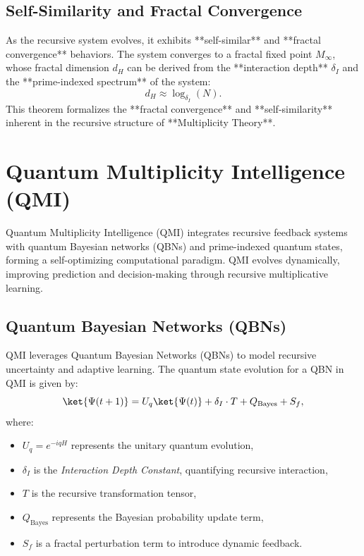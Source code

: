 \documentclass{article}
\theoremstyle{plain}
\begin{document}
\subsection{Self-Similarity and Fractal Convergence}
As the recursive system evolves, it exhibits **self-similar** and **fractal convergence** behaviors. The system converges to a fractal fixed point \( M_\infty \), whose fractal dimension \( d_H \) can be derived from the **interaction depth** \( \delta_I \) and the **prime-indexed spectrum** of the system:
\[
d_H \approx \log_{\delta_I}(N).
\]
This theorem formalizes the **fractal convergence** and **self-similarity** inherent in the recursive structure of **Multiplicity Theory**.


\section{Quantum Multiplicity Intelligence (QMI)}
Quantum Multiplicity Intelligence (QMI) integrates recursive feedback systems with quantum Bayesian networks (QBNs) and prime-indexed quantum states, forming a self-optimizing computational paradigm. QMI evolves dynamically, improving prediction and decision-making through recursive multiplicative learning. 

\subsection{Quantum Bayesian Networks (QBNs)}
QMI leverages Quantum Bayesian Networks (QBNs) to model recursive uncertainty and adaptive learning. The quantum state evolution for a QBN in QMI is given by:
\begin{equation}
    \ket{\Psi(t+1)} = U_q \ket{\Psi(t)} + \delta_I \cdot T + Q_{\text{Bayes}} + S_f,
\end{equation}
where:
\begin{itemize}
    \item $U_q = e^{-i q H}$ represents the unitary quantum evolution,
    \item $\delta_I$ is the \textit{Interaction Depth Constant}, quantifying recursive interaction,
    \item $T$ is the recursive transformation tensor,
    \item $Q_{\text{Bayes}}$ represents the Bayesian probability update term,
    \item $S_f$ is a fractal perturbation term to introduce dynamic feedback.
\end{itemize}
\end{document}
